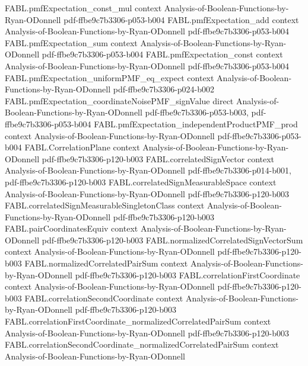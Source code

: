 \begin{theorem}
  {FABL.pmfExpectation_const_mul}
  {context}
  {Analysis-of-Boolean-Functions-by-Ryan-ODonnell}
  {pdf-ffbe9c7b3306-p053-b004}
\proofstep
  {FABL.pmfExpectation_add}
  {context}
  {Analysis-of-Boolean-Functions-by-Ryan-ODonnell}
  {pdf-ffbe9c7b3306-p053-b004}
\proofstep
  {FABL.pmfExpectation_sum}
  {context}
  {Analysis-of-Boolean-Functions-by-Ryan-ODonnell}
  {pdf-ffbe9c7b3306-p053-b004}
\proofstep
  {FABL.pmfExpectation_const}
  {context}
  {Analysis-of-Boolean-Functions-by-Ryan-ODonnell}
  {pdf-ffbe9c7b3306-p053-b004}
\proofstep
  {FABL.pmfExpectation_uniformPMF_eq_expect}
  {context}
  {Analysis-of-Boolean-Functions-by-Ryan-ODonnell}
  {pdf-ffbe9c7b3306-p024-b002}
\proofstep
  {FABL.pmfExpectation_coordinateNoisePMF_signValue}
  {direct}
  {Analysis-of-Boolean-Functions-by-Ryan-ODonnell}
  {pdf-ffbe9c7b3306-p053-b003,
    pdf-ffbe9c7b3306-p053-b004}
\proofstep
  {FABL.pmfExpectation_independentProductPMF_prod}
  {context}
  {Analysis-of-Boolean-Functions-by-Ryan-ODonnell}
  {pdf-ffbe9c7b3306-p053-b004}
\proofstep
  {FABL.CorrelationPlane}
  {context}
  {Analysis-of-Boolean-Functions-by-Ryan-ODonnell}
  {pdf-ffbe9c7b3306-p120-b003}
\proofstep
  {FABL.correlatedSignVector}
  {context}
  {Analysis-of-Boolean-Functions-by-Ryan-ODonnell}
  {pdf-ffbe9c7b3306-p014-b001,
    pdf-ffbe9c7b3306-p120-b003}
\proofstep
  {FABL.correlatedSignMeasurableSpace}
  {context}
  {Analysis-of-Boolean-Functions-by-Ryan-ODonnell}
  {pdf-ffbe9c7b3306-p120-b003}
\proofstep
  {FABL.correlatedSignMeasurableSingletonClass}
  {context}
  {Analysis-of-Boolean-Functions-by-Ryan-ODonnell}
  {pdf-ffbe9c7b3306-p120-b003}
\proofstep
  {FABL.pairCoordinatesEquiv}
  {context}
  {Analysis-of-Boolean-Functions-by-Ryan-ODonnell}
  {pdf-ffbe9c7b3306-p120-b003}
\proofstep
  {FABL.normalizedCorrelatedSignVectorSum}
  {context}
  {Analysis-of-Boolean-Functions-by-Ryan-ODonnell}
  {pdf-ffbe9c7b3306-p120-b003}
\proofstep
  {FABL.normalizedCorrelatedPairSum}
  {context}
  {Analysis-of-Boolean-Functions-by-Ryan-ODonnell}
  {pdf-ffbe9c7b3306-p120-b003}
\proofstep
  {FABL.correlationFirstCoordinate}
  {context}
  {Analysis-of-Boolean-Functions-by-Ryan-ODonnell}
  {pdf-ffbe9c7b3306-p120-b003}
\proofstep
  {FABL.correlationSecondCoordinate}
  {context}
  {Analysis-of-Boolean-Functions-by-Ryan-ODonnell}
  {pdf-ffbe9c7b3306-p120-b003}
\proofstep
  {FABL.correlationFirstCoordinate_normalizedCorrelatedPairSum}
  {context}
  {Analysis-of-Boolean-Functions-by-Ryan-ODonnell}
  {pdf-ffbe9c7b3306-p120-b003}
\proofstep
  {FABL.correlationSecondCoordinate_normalizedCorrelatedPairSum}
  {context}
  {Analysis-of-Boolean-Functions-by-Ryan-ODonnell}

\end{theorem}
